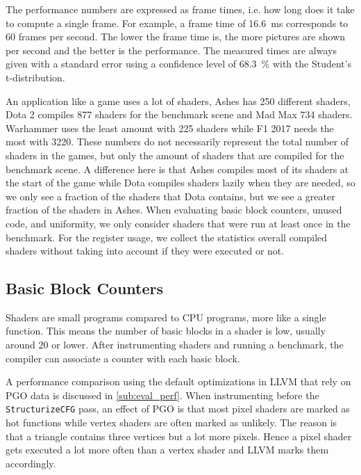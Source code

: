 The performance numbers are expressed as frame times, i.e. how long does it take to compute a single frame.
For example, a frame time of \SI{16.6}{\milli\second} corresponds to 60 frames per second.
The lower the frame time is, the more pictures are shown per second and the better is the performance.
The measured times are always given with a standard error using a confidence level of \SI{68.3}{\percent} with the Student's t-distribution.

An application like a game uses a lot of shaders, Ashes has 250 different shaders, Dota 2 compiles 877 shaders for the benchmark scene and Mad Max 734 shaders.
Warhammer uses the least amount with 225 shaders while F1 2017 needs the most with 3220.
These numbers do not necessarily represent the total number of shaders in the games, but only the amount of shaders that are compiled for the benchmark scene.
A difference here is that Ashes compiles most of its shaders at the start of the game while Dota compiles shaders lazily when they are needed, so we only see a fraction of the shaders that Dota contains, but we see a greater fraction of the shaders in Ashes.
When evaluating basic block counters, unused code, and uniformity, we only consider shaders that were run at least once in the benchmark.
For the register usage, we collect the statistics overall compiled shaders without taking into account if they were executed or not.

\subsection{Basic Block Counters}
\label{sub:eval_counters}
Shaders are small programs compared to CPU programs, more like a single function.
This means the number of basic blocks in a shader is low, usually around 20 or lower.
After instrumenting shaders and running a benchmark, the compiler can associate a counter with each basic block.

A performance comparison using the default optimizations in LLVM that rely on PGO data is discussed in \cref{sub:eval_perf}.
When instrumenting before the \texttt{StructurizeCFG} pass, an effect of PGO is that most pixel shaders are marked as hot functions while vertex shaders are often marked as unlikely.
The reason is that a triangle contains three vertices but a lot more pixels.
Hence a pixel shader gets executed a lot more often than a vertex shader and LLVM marks them accordingly.

